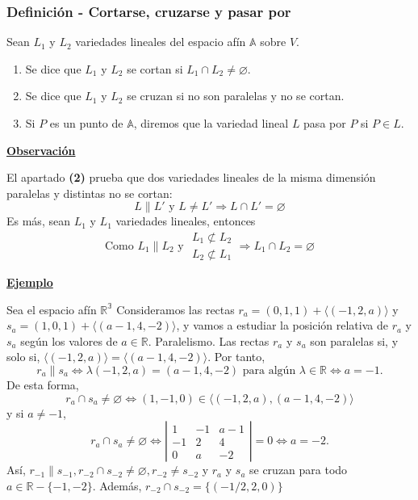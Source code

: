 \documentclass[12pt, a4paper, ones, notitlepage, openany,titlepage]{article}
\newcommand{\observacion}{\noindent\underline{\textbf{Observación}}}
\newcommand{\ejemplo}{\noindent\underline{\textbf{Ejemplo}}}
\begin{document}
\subsubsection{Definición - Cortarse, cruzarse y pasar por}
\noindent Sean $L_{1}$ y $L_{2}$ variedades lineales del espacio afín $\mathbb{A}$ sobre $V$.
\begin{enumerate}[label=(\arabic*)]
\item Se dice que $L_{1}$ y $L_{2}$ se cortan si $L_{1} \cap L_{2} \neq \varnothing$.
\item Se dice que $L_{1}$ y $L_{2}$ se cruzan si no son paralelas y no se cortan.
\item Si $P$ es un punto de $\mathbb{A}$, diremos que la variedad lineal $L$ pasa por $P$ si $P \in L$.
\end{enumerate}
\observacion

El apartado \textbf{(2)} prueba que dos variedades lineales de la misma dimensión paralelas y distintas no se cortan:
$$
L \| L' \text{ y } L \neq L' \Longrightarrow L \cap L' = \varnothing
$$
\noindent Es más, sean $L_1$ y $L_1$ variedades lineales, entonces
$$
\text{Como } L_1 \| L_2 \text{ y } \begin{array}{r}
	L_1 \not\subset L_2 \\
	L_2 \not\subset L_1
\end{array} \Longrightarrow L_1 \cap L_2 = \varnothing
$$

\ejemplo

Sea el espacio afín $\mathbb{R^3}$ Consideramos las rectas $r_{a}=(0,1,1)+\langle(-1,2, a)\rangle$ y $s_{a}=(1,0,1)+\langle(a-1,4,-2)\rangle$, y vamos a estudiar la posición relativa de $r_{a}$ y $s_{a}$ según los valores de $a \in \mathbb{R}$.
Paralelismo. Las rectas $r_{a}$ y $s_{a}$ son paralelas si, y solo si, $\langle(-1,2, a)\rangle=\langle(a-1,4,-2)\rangle$. Por tanto,
$$
r_{a} \| s_{a} \Longleftrightarrow \lambda(-1,2, a)=(a-1,4,-2) \text { para algún } \lambda \in \mathbb{R} \Longleftrightarrow a=-1 .
$$
De esta forma,
$$
r_{a} \cap s_{a} \neq \varnothing \Longleftrightarrow(1,-1,0) \in\langle(-1,2, a),(a-1,4,-2)\rangle
$$
y si $a \neq-1$,
$$
r_{a} \cap s_{a} \neq \varnothing \Longleftrightarrow\left|\begin{array}{rrr}
1 & -1 & a-1 \\
-1 & 2 & 4 \\
0 & a & -2
\end{array}\right|=0 \Longleftrightarrow a=-2 .
$$
Así, $r_{-1} \| s_{-1}, r_{-2} \cap s_{-2} \neq \varnothing, r_{-2} \neq s_{-2}$ y $r_{a}$ y $s_{a}$ se cruzan para todo $a \in \mathbb{R}-\{-1,-2\}$. Además, $r_{-2} \cap s_{-2}=\{(-1 / 2,2,0)\}$
\end{document}
